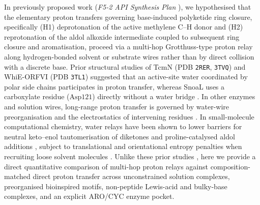 \documentclass[11pt,a4paper]{article}
\begin{document}
In previously proposed work (\textit{F5-2 API Synthesis Plan} \cite{kleber2020}), we hypothesised that the elementary proton transfers governing base-induced polyketide ring closure, specifically (H1) deprotonation of the active methylene $\text{C--H}$ donor and (H2) reprotonation of the aldol alkoxide intermediate coupled to subsequent ring closure and aromatisation, proceed via a multi-hop Grotthuss-type proton relay \cite{agmon1995,marx1999,cukierman2006} along hydrogen-bonded solvent or substrate wires rather than by direct collision with a discrete base. Prior structural studies of TcmN (PDB \texttt{2RER}, \texttt{3TVQ}) \cite{ames2008} and WhiE-ORFVI (PDB \texttt{3TL1}) \cite{lee2012} suggested that an active-site water coordinated by polar side chains participates in proton transfer, whereas SnoaL uses a carboxylate residue ($\text{Asp121}$) directly without a water bridge \cite{sultana2004}. In other enzymes and solution wires, long-range proton transfer is governed by water-wire preorganisation and the electrostatics of intervening residues \cite{silverman1988,riccardi2006,kirby1980,odella2018,hammes2015}. In small-molecule computational chemistry, water relays have been shown to lower barriers for neutral keto--enol tautomerisation of diketones \cite{alagona2010} and proline-catalysed aldol additions \cite{zotova2007,armstrong2014,chakrabarty2015,nobakht2018}, subject to translational and orientational entropy penalties when recruiting loose solvent molecules \cite{armstrong2014,grimme2012}. Unlike these prior studies \cite{ames2008,lee2012,alagona2010,armstrong2014}, here we provide a direct quantitative comparison of multi-hop proton relays against composition-matched direct proton transfer across unconstrained solution complexes, preorganised bioinspired motifs, non-peptide Lewis-acid and bulky-base complexes, and an explicit ARO/CYC enzyme pocket.
\end{document}

